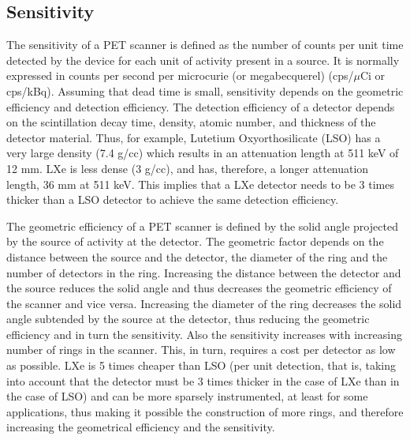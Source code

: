 
\subsection{Sensitivity}

The sensitivity of a PET scanner is defined as the number of counts per unit time detected by the device for each unit of activity present in a source. It is normally expressed in counts per second per microcurie (or megabecquerel) (cps/$\mu$Ci or cps/kBq). Assuming that dead time is small, sensitivity depends on the geometric efficiency and detection efficiency. The detection efficiency of a detector depends on the scintillation decay time, density, atomic number, and thickness of the detector material. Thus, for example, Lutetium Oxyorthosilicate (LSO) has a very large density (7.4 g/cc) which results in an attenuation length at 511 keV of 12 mm. LXe is less dense (3 g/cc), and has, therefore, a longer attenuation length, 36 mm at 511 keV. This implies that a LXe detector needs to be 3 times thicker than a LSO detector to achieve the same detection efficiency.

The geometric efficiency of a PET scanner is defined by the solid angle projected by the source of activity at the detector. The geometric factor depends on the distance between the source and the detector, the diameter of the ring and the number of detectors in the ring. Increasing the distance between the detector and the source reduces the solid angle and thus decreases the geometric efficiency of the scanner and vice versa. Increasing the diameter of the ring decreases the solid angle subtended by the source at the detector, thus reducing the geometric efficiency and in turn the sensitivity. Also the sensitivity increases with increasing number of rings in the scanner. This, in turn, requires a cost per detector as low as possible. LXe is 5 times cheaper than LSO (per unit detection, that is, taking into account that the detector must be 3 times thicker in the case of LXe than in the case of LSO) and can be more sparsely instrumented, at least for some applications, thus making it possible the construction of more rings, and therefore increasing the geometrical efficiency and the sensitivity. 


